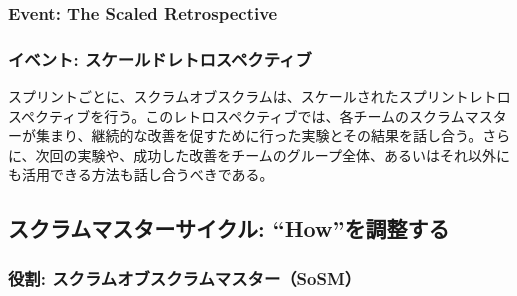 \documentclass[12pt,a4paper,parskip=full]{scrartcl}
\begin{document}
\subsubsection{Event: The Scaled
Retrospective}\label{event-the-scaled-retrospective}
\fi
\subsubsection{イベント: スケールドレトロスペクティブ}\label{event-the-scaled-retrospective}

スプリントごとに、スクラムオブスクラムは、スケールされたスプリントレトロスペクティブを行う。このレトロスペクティブでは、各チームのスクラムマスターが集まり、継続的な改善を促すために行った実験とその結果を話し合う。さらに、次回の実験や、成功した改善をチームのグループ全体、あるいはそれ以外にも活用できる方法も話し合うべきである。

\subsection{スクラムマスターサイクル: “How”を調整する}\label{the-scrum-master-cycle}

\subsubsection{役割: スクラムオブスクラムマスター（SoSM）}\label{role-the-scrum-of-scrums-master}
\end{document}
